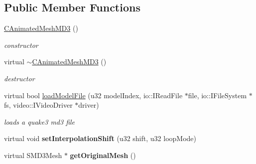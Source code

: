 \subsection*{Public Member Functions}
\begin{DoxyCompactItemize}
\item 
\hypertarget{classirr_1_1scene_1_1_c_animated_mesh_m_d3_a3989b5957814890691d392fe78272a0f}{\hyperlink{classirr_1_1scene_1_1_c_animated_mesh_m_d3_a3989b5957814890691d392fe78272a0f}{C\-Animated\-Mesh\-M\-D3} ()}\label{classirr_1_1scene_1_1_c_animated_mesh_m_d3_a3989b5957814890691d392fe78272a0f}

\begin{DoxyCompactList}\small\item\em constructor \end{DoxyCompactList}\item 
\hypertarget{classirr_1_1scene_1_1_c_animated_mesh_m_d3_a190b3c19a5cadbdf02bb61983e1e9a20}{virtual \hyperlink{classirr_1_1scene_1_1_c_animated_mesh_m_d3_a190b3c19a5cadbdf02bb61983e1e9a20}{$\sim$\-C\-Animated\-Mesh\-M\-D3} ()}\label{classirr_1_1scene_1_1_c_animated_mesh_m_d3_a190b3c19a5cadbdf02bb61983e1e9a20}

\begin{DoxyCompactList}\small\item\em destructor \end{DoxyCompactList}\item 
\hypertarget{classirr_1_1scene_1_1_c_animated_mesh_m_d3_ae717c0f661a58db60a9f083e477cf2b7}{virtual bool \hyperlink{classirr_1_1scene_1_1_c_animated_mesh_m_d3_ae717c0f661a58db60a9f083e477cf2b7}{load\-Model\-File} (u32 model\-Index, io\-::\-I\-Read\-File $\ast$file, io\-::\-I\-File\-System $\ast$fs, video\-::\-I\-Video\-Driver $\ast$driver)}\label{classirr_1_1scene_1_1_c_animated_mesh_m_d3_ae717c0f661a58db60a9f083e477cf2b7}

\begin{DoxyCompactList}\small\item\em loads a quake3 md3 file \end{DoxyCompactList}\item 
\hypertarget{classirr_1_1scene_1_1_c_animated_mesh_m_d3_af248d8da3a675267faac454e8dee99fb}{virtual void {\bfseries set\-Interpolation\-Shift} (u32 shift, u32 loop\-Mode)}\label{classirr_1_1scene_1_1_c_animated_mesh_m_d3_af248d8da3a675267faac454e8dee99fb}

\item 
\hypertarget{classirr_1_1scene_1_1_c_animated_mesh_m_d3_a335bc1227ab20ce4b1bc36953aa340bd}{virtual S\-M\-D3\-Mesh $\ast$ {\bfseries get\-Original\-Mesh} ()}\label{classirr_1_1scene_1_1_c_animated_mesh_m_d3_a335bc1227ab20ce4b1bc36953aa340bd}


\end{DoxyCompactItemize}
